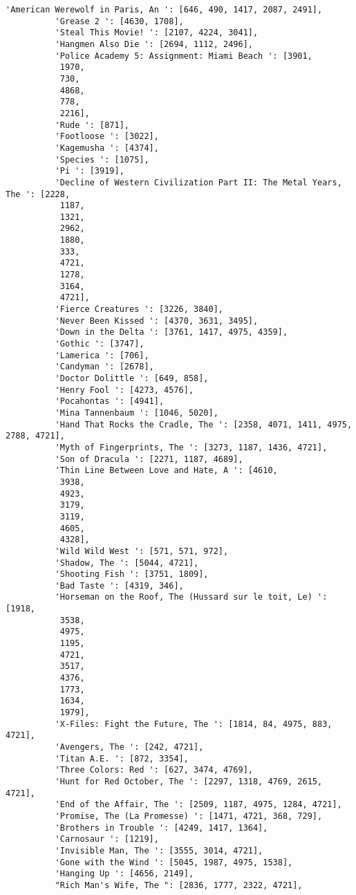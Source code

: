 \documentclass[11pt]{article}
\begin{document}
\begin{Verbatim}[commandchars=\\\{\}]
          'American Werewolf in Paris, An ': [646, 490, 1417, 2087, 2491],
          'Grease 2 ': [4630, 1708],
          'Steal This Movie! ': [2107, 4224, 3041],
          'Hangmen Also Die ': [2694, 1112, 2496],
          'Police Academy 5: Assignment: Miami Beach ': [3901,
           1970,
           730,
           4868,
           778,
           2216],
          'Rude ': [871],
          'Footloose ': [3022],
          'Kagemusha ': [4374],
          'Species ': [1075],
          'Pi ': [3919],
          'Decline of Western Civilization Part II: The Metal Years, The ': [2228,
           1187,
           1321,
           2962,
           1880,
           333,
           4721,
           1278,
           3164,
           4721],
          'Fierce Creatures ': [3226, 3840],
          'Never Been Kissed ': [4370, 3631, 3495],
          'Down in the Delta ': [3761, 1417, 4975, 4359],
          'Gothic ': [3747],
          'Lamerica ': [706],
          'Candyman ': [2678],
          'Doctor Dolittle ': [649, 858],
          'Henry Fool ': [4273, 4576],
          'Pocahontas ': [4941],
          'Mina Tannenbaum ': [1046, 5020],
          'Hand That Rocks the Cradle, The ': [2358, 4071, 1411, 4975, 2788, 4721],
          'Myth of Fingerprints, The ': [3273, 1187, 1436, 4721],
          'Son of Dracula ': [2271, 1187, 4689],
          'Thin Line Between Love and Hate, A ': [4610,
           3938,
           4923,
           3179,
           3119,
           4605,
           4328],
          'Wild Wild West ': [571, 571, 972],
          'Shadow, The ': [5044, 4721],
          'Shooting Fish ': [3751, 1809],
          'Bad Taste ': [4319, 346],
          'Horseman on the Roof, The (Hussard sur le toit, Le) ': [1918,
           3538,
           4975,
           1195,
           4721,
           3517,
           4376,
           1773,
           1634,
           1979],
          'X-Files: Fight the Future, The ': [1814, 84, 4975, 883, 4721],
          'Avengers, The ': [242, 4721],
          'Titan A.E. ': [872, 3354],
          'Three Colors: Red ': [627, 3474, 4769],
          'Hunt for Red October, The ': [2297, 1318, 4769, 2615, 4721],
          'End of the Affair, The ': [2509, 1187, 4975, 1284, 4721],
          'Promise, The (La Promesse) ': [1471, 4721, 368, 729],
          'Brothers in Trouble ': [4249, 1417, 1364],
          'Carnosaur ': [1219],
          'Invisible Man, The ': [3555, 3014, 4721],
          'Gone with the Wind ': [5045, 1987, 4975, 1538],
          'Hanging Up ': [4656, 2149],
          "Rich Man's Wife, The ": [2836, 1777, 2322, 4721],

\end{Verbatim}
\end{document}
